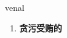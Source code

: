 
\begin{frame}
{\huge venal}
\begin{center}
\begin{enumerate}\Large
  \item \textbf{贪污受贿的}
\end{enumerate}
\end{center}
\end{frame}
